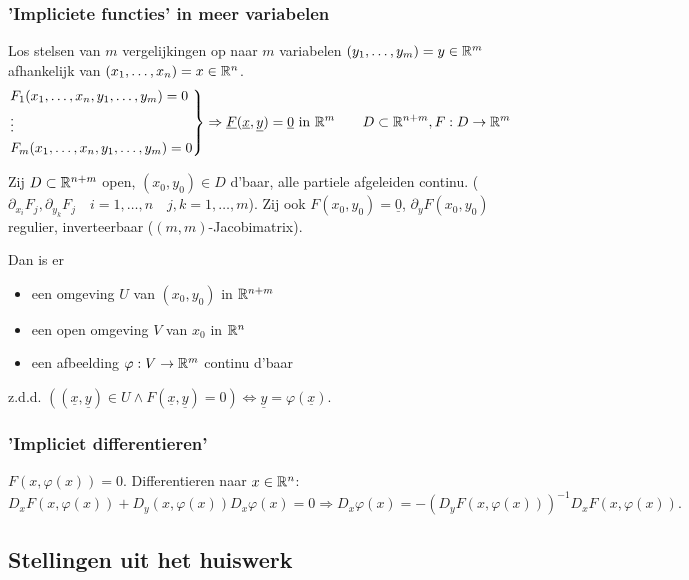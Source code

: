 \documentclass{2wa40summary}
\begin{document}
			
			\subsubsection{'Impliciete functies' in meer variabelen}
				Los stelsen van $m$ vergelijkingen op naar $m$ variabelen $(y_1, \dots ,y_m) = y \in \mathbb{R}^m$ afhankelijk van $ (x_1, \dots , x_n) = x \in \mathbb{R}^n $.
				\[
				\begin{rcases*}
				F_1(x_1,\dots,x_n,y_1,\dots,y_m)=0 \\
				\vdots \\
				F_m(x_1,\dots,x_n,y_1,\dots,y_m)=0
				\end{rcases*} \Rightarrow \underline{F}(\underline{x},\underline{y})=\underline{0} \text{ in } \reals^m \qquad D \subset \reals^{n+m}, F: D \rightarrow \reals^m
				\]
				
				 Zij $ D\subset \mathbb{R}^{n+m} $ open, $ (x_0, y_0) \in D $ d'baar, alle partiele afgeleiden continu. ($ \partial_{x_i}F_j , \partial_{y_k}F_j \quad i=1,\dots,n \quad j,k=1,\dots,m $). Zij ook $ F(x_0, y_0) = \underline{0}$, $ \partial_y F(x_0,y_0) $ regulier, inverteerbaar ($ (m,m) $-Jacobimatrix).
				
				Dan is er \begin{itemize}
					\item[] een omgeving $ U $ van $ (x_0,y_0) $ in $ \mathbb{R}^{n+m} $
					\item[] een open omgeving $V$ van $x_0$ in $\mathbb{R}^n$
					\item[] een afbeelding $ \varphi : V\rightarrow \mathbb{R}^m $ continu d'baar 
				\end{itemize}
				z.d.d. $ ((\underline{x},\underline{y}) \in U \wedge F(\underline{x},\underline{y})=0) \Leftrightarrow \underline{y}=\varphi (\underline{x}). $
				
			\subsubsection{'Impliciet differentieren'}
				$ F(x,\varphi(x))=0 $. Differentieren naar $ x\in \mathbb{R}^n $:
				\[ D_x F(x,\varphi(x)) + D_y (x,\varphi(x))D_x \varphi(x) = 0 \Rightarrow D_x \varphi(x) = -(D_y F(x,\varphi(x)))^{-1} D_x F(x,\varphi(x)). \]
				
		\subsection{Stellingen uit het huiswerk}
			
\end{document}
